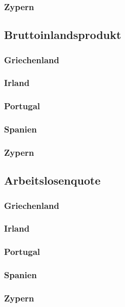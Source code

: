 \subsubsection{Zypern}
\subsection{Bruttoinlandsprodukt}
\subsubsection{Griechenland}
\subsubsection{Irland}
\subsubsection{Portugal}
\subsubsection{Spanien}
\subsubsection{Zypern}
\subsection{Arbeitslosenquote}
\subsubsection{Griechenland}
\subsubsection{Irland}
\subsubsection{Portugal}
\subsubsection{Spanien}
\subsubsection{Zypern}
